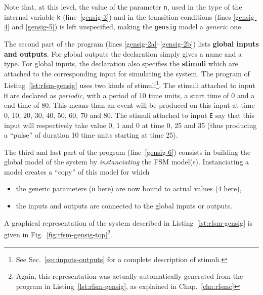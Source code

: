 Note that, at this level, the value of the parameter \verb|n|, used in the type of the internal
variable \verb|k| (line~\ref{gensig-3}) and in the transition conditions (lines \ref{gensig-4} and
\ref{gensig-5}) is left unspecified, making the \verb|gensig| model a \emph{generic} one.

\medskip The second part of the program (lines \ref{gensig-2a}--\ref{gensig-2b}) lists \textbf{global inputs and
  outputs}.
For global outputs the
declaration simply gives a name and a type.  For global inputs, the declaration also specifies the
\textbf{stimuli} which are attached to the corresponding input for simulating the system. The
program of Listing~\ref{lst:rfsm-gensig} uses two kinds of stimuli\footnote{See
  Sec.~\ref{sec:inputs-outputs} for a complete description of stimuli.}. The stimuli attached to input
\verb|H| are declared as \emph{periodic}, with a period of 10 time units, a start time of 0 and a
end time of 80. This means than an event will be produced on this input at time 0, 10, 20, 30, 40,
50, 60, 70 and 80. The stimuli attached to input \verb|E| say that this input will respectively take
value 0, 1 and 0 at time 0, 25 and 35 (thus producing a ``pulse'' of duration 10 time units starting
at time 25).

\medskip
The third and last part of the program (line~\ref{gensig-6}) consists in building the global model of the system by
\emph{instanciating} the FSM model(s).
Instanciating a model creates a ``copy'' of this model for which
\begin{itemize}
\item the generic parameters (\verb|n| here) are now bound to actual values (4 here),
\item the inputs and outputs are connected to the global inputs or outputs. 
\end{itemize}

\medskip
A graphical representation of the system described in Listing~\ref{lst:rfsm-gensig} is given in
Fig.~\ref{fig:rfsm-gensig-top}\footnote{Again, this representation was actually automatically generated from the
program in Listing~\ref{lst:rfsm-gensig}, as explained in Chap.~\ref{cha:rfsmc}}. 

